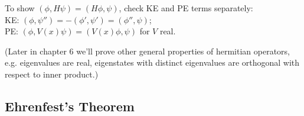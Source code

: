 \documentclass[a4paper]{article}
\begin{document}
To show $\left(\phi,H\psi\right) = \left(H\phi,\psi\right)$, check KE and PE terms separately:\\
KE: $\left(\phi,\psi''\right) = -\left(\phi',\psi'\right) = \left(\phi'',\psi\right)$;\\
PE: $\left(\phi,V\left(x\right)\psi\right) = \left(V\left(x\right)\phi,\psi\right)$ for $V$ real.

(Later in chapter 6 we'll prove other general properties of hermitian operators, e.g. eigenvalues are real, eigenstates with distinct eigenvalues are orthogonal with respect to inner product.)

\subsection{Ehrenfest's Theorem}
\end{document}
